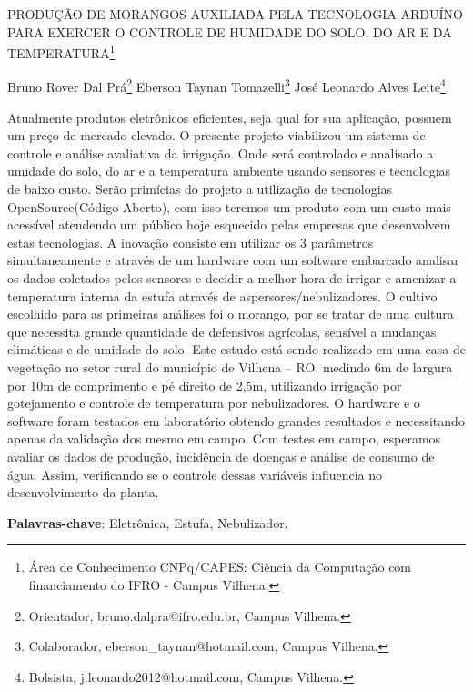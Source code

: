 \documentclass[article,12pt,onesidea,4paper,english,brazil]{abntex2}
\begin{document}
	
	
	\frenchspacing 
	
	\begin{center}
		\LARGE PRODUÇÃO DE MORANGOS AUXILIADA PELA TECNOLOGIA ARDUÍNO PARA EXERCER O CONTROLE DE HUMIDADE DO SOLO, DO AR E DA TEMPERATURA\footnote{Área de Conhecimento CNPq/CAPES: Ciência da Computação com financiamento do IFRO - Campus Vilhena.}
		
		\normalsize
		Bruno Rover Dal Prá\footnote{Orientador, bruno.dalpra@ifro.edu.br, Campus Vilhena.} 
	Eberson Taynan Tomazelli\footnote{Colaborador, eberson\_taynan@hotmail.com, Campus Vilhena.} 
		José Leonardo Alves Leite\footnote{Bolsista, j.leonardo2012@hotmail.com, Campus Vilhena.} 
	\end{center}
	
	\begin{resumoumacoluna}
		Atualmente produtos eletrônicos eficientes, seja qual for sua aplicação, possuem um preço de mercado elevado. O presente projeto viabilizou um sistema de controle e análise avaliativa da irrigação. Onde será controlado e analisado a umidade do solo, do ar e a temperatura ambiente usando sensores e tecnologias de baixo custo. Serão primícias do projeto a utilização de tecnologias OpenSource(Código Aberto), com isso teremos um produto com um custo mais acessível atendendo um público hoje esquecido pelas empresas que desenvolvem estas tecnologias. A inovação consiste em utilizar os 3 parâmetros simultaneamente e através de um hardware com um software embarcado analisar os dados coletados pelos sensores e decidir a melhor hora de irrigar e amenizar a temperatura interna da estufa através de aspersores/nebulizadores. O cultivo escolhido para as primeiras análises foi o morango, por se tratar de uma cultura que necessita grande quantidade de defensivos agrícolas, sensível a mudanças climáticas e de umidade do solo. Este estudo está sendo realizado em uma casa de vegetação no setor rural do município de Vilhena – RO, medindo 6m de largura por 10m de comprimento e pé direito de 2,5m, utilizando irrigação por gotejamento e controle de temperatura por nebulizadores. O hardware e o software foram testados em laboratório obtendo grandes resultados e necessitando apenas da validação dos mesmo em campo. Com testes em campo, esperamos avaliar os dados de produção, incidência de doenças e análise de consumo de água. Assim, verificando se o controle dessas variáveis influencia no desenvolvimento da planta.
		\vspace{\onelineskip}
		
		\noindent
		\textbf{Palavras-chave}: Eletrônica, Estufa, Nebulizador.
	\end{resumoumacoluna}
	
\end{document}
